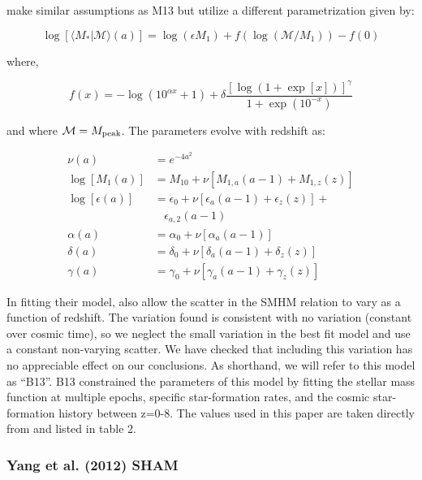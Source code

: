 \documentclass[a4paper,fleqn,usenatbib]{mnras}
\begin{document}
\citet{Behroozi:2013fg} make similar assumptions as M13 but utilize a different parametrization given by:
%
\begin{linenomath}
\begin{equation}
\log[\langle M_*|\mathcal{M} \rangle(a)] = \log(\epsilon M_1) + f(\log(\mathcal{M}/M_1)) - f(0)
\end{equation}
\end{linenomath}
%
where,
% 
\begin{linenomath}
\begin{equation}
f(x) = -\log(10^{\alpha x}+1) + \delta\frac{\left[ \log(1+\exp[x])\right]^{\gamma}}{1+\exp(10^{-x})}
\end{equation}
\end{linenomath}
%
and where $\mathcal{M} = M_{\rm peak}$.  The parameters evolve with redshift as:
%
\begin{linenomath}
\begin{align}
\nu(a) & = e^{-4a^2}  \\
\log[M_1(a)] & =  M_{10} + \nu\left[ M_{1,a}(a-1) + M_{1,z}(z) \right] \\
\log[\epsilon(a)] & = \epsilon_0 + \nu \left[\epsilon_a(a-1) +\epsilon_z (z) \right] + \\ \nonumber 
& ~~~~ \epsilon_{a,2}(a-1)  \\
\alpha(a) & =  \alpha_{0} + \nu\left[ \alpha_a(a-1)\right] \\
\delta(a) & =   \delta_{0} + \nu\left[ \delta_a(a-1) + \delta_z (z)\right] \\
\gamma(a) &= \gamma_{0} + \nu\left[ \gamma_a(a-1) + \gamma_z (z)\right]
\end{align}
\end{linenomath}
% 
In fitting their model, \cite{Behroozi:2013fg} also allow the scatter in the SMHM relation to vary as a function of redshift.  The variation found is consistent with no variation (constant over cosmic time), so we neglect the small variation in the best fit model and use a constant non-varying scatter.  We have checked that including this variation has no appreciable effect on our conclusions.   As shorthand, we will refer to this model as ``B13''.   B13 constrained the parameters of this model by fitting the stellar mass function at multiple epochs, specific star-formation rates, and the cosmic star-formation history between z=0-8.  The values used in this paper are taken directly from \cite{Behroozi:2013fg} and listed in table 2.


\subsubsection{Yang et al. (2012) SHAM}
\label{sec:y12}
\end{document}
